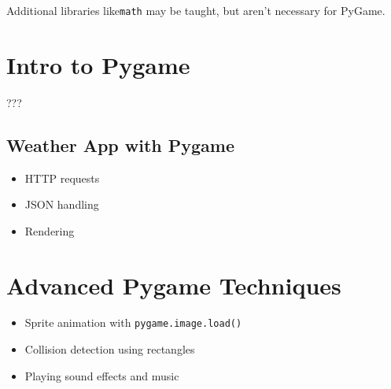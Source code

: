 \documentclass{article}
\begin{document}
Additional libraries like\verb|math| may be taught, but aren't necessary for PyGame.

\section{Intro to Pygame}
???

\subsection{Weather App with Pygame}
\begin{itemize}
    \item HTTP requests
    \item JSON handling
    \item Rendering
\end{itemize}

\section{Advanced Pygame Techniques}
\begin{itemize}
    \item Sprite animation with \verb|pygame.image.load()|
    \item Collision detection using rectangles
    \item Playing sound effects and music
\end{itemize}

\end{document}
